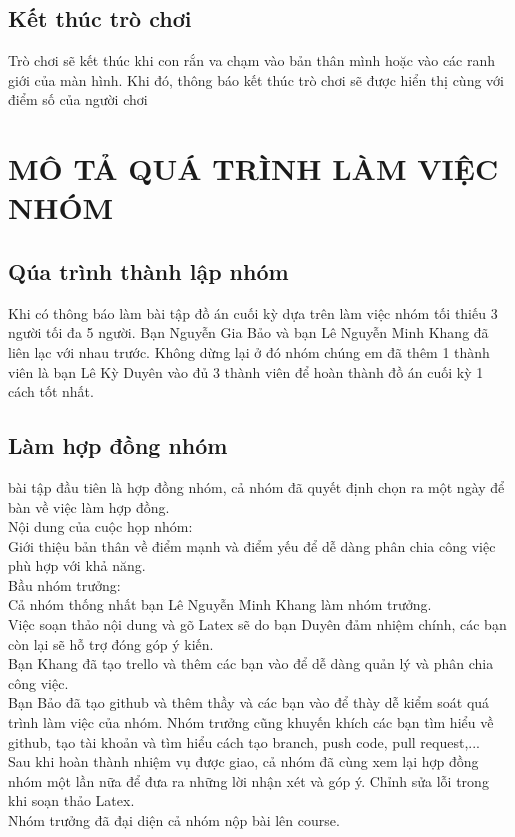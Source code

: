 \documentclass[article]{llncs}
\begin{document}
\subsection{Kết thúc trò chơi}
    Trò chơi sẽ kết thúc khi con rắn va chạm vào bản thân mình hoặc vào các ranh giới của màn hình. Khi đó, thông báo kết thúc trò chơi sẽ được hiển thị cùng với điểm số của người chơi

\newpage

\section{MÔ TẢ QUÁ TRÌNH LÀM VIỆC NHÓM}
\subsection{Qúa trình thành lập nhóm}
    Khi có thông báo làm bài tập đồ án cuối kỳ dựa trên làm việc nhóm tối thiếu 3 người tối đa 5 người. Bạn Nguyễn Gia Bảo và bạn Lê Nguyễn Minh Khang đã liên lạc với nhau trước. Không dừng lại ở đó nhóm chúng em đã thêm 1 thành viên là bạn Lê Kỳ Duyên vào đủ 3 thành viên để hoàn thành đồ án cuối kỳ 1 cách tốt nhất.
\subsection{Làm hợp đồng nhóm}
    bài tập đầu tiên là hợp đồng nhóm, cả nhóm đã quyết định chọn ra một ngày để bàn về việc làm hợp đồng.\\
    Nội dung của cuộc họp nhóm:\\
    Giới thiệu bản thân về điểm mạnh và điểm yếu để dễ dàng phân chia công việc phù hợp với khả năng.\\
    Bầu nhóm trưởng:\\
    Cả nhóm thống nhất bạn Lê Nguyễn Minh Khang làm nhóm trưởng.\\
    Việc soạn thảo nội dung và gõ Latex sẽ do bạn Duyên đảm nhiệm chính, các bạn còn lại sẽ hỗ trợ đóng góp ý kiến.\\
    Bạn Khang đã tạo trello và thêm các bạn vào để dễ dàng quản lý và phân chia công việc.\\
    Bạn Bảo đã tạo github và thêm thầy và các bạn vào để thày dễ kiểm soát quá trình làm việc của nhóm. Nhóm trưởng cũng khuyến khích các bạn tìm hiểu về github, tạo tài khoản và tìm hiểu cách tạo branch, push code, pull request,...\\
    Sau khi hoàn thành nhiệm vụ được giao, cả nhóm đã cùng xem lại hợp đồng nhóm một lần nữa để đưa ra những lời nhận xét và góp ý. Chỉnh sửa lỗi trong khi soạn thảo Latex.\\
    Nhóm trưởng đã đại diện cả nhóm nộp bài lên course.
\end{document}
